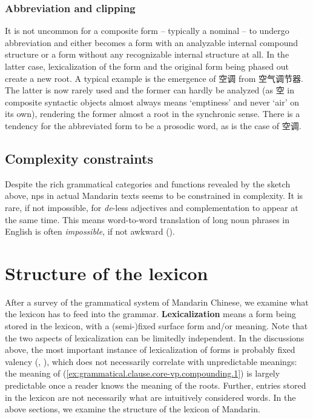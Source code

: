 \documentclass[UTF8, a4paper, oneside, scheme=plain, 12pt]{ctexrep}
\newcommand*{\concept}[1]{\textbf{#1}}
\newcommand{\form}[1]{\emph{#1}}
\newcommand{\translate}[1]{`#1'}
\begin{document}
\subsubsection{Abbreviation and clipping}\label{sec:grammatical.np.derivation.abbreviation}

It is not uncommon for a composite form -- typically a nominal -- to undergo abbreviation
and either becomes a form with an analyzable internal compound structure
or a form without any recognizable internal structure at all.
In the latter case, lexicalization of the form and the original form being phased out
create a new root.
A typical example is the emergence of 空调 from 空气调节器.
The latter is now rarely used
and the former can hardly be analyzed 
(as 空 in composite syntactic objects almost always means \translate{emptiness} and never \translate{air} on its own),
rendering the former almost a root in the synchronic sense.
There is a tendency for the abbreviated form to be a prosodic word,
as is the case of 空调.

\subsection{Complexity constraints}\label{sec:grammatical.np.complexity}

Despite the rich grammatical categories and functions revealed by the sketch above,
\acp{np} in actual Mandarin texts seems to be constrained in complexity.
It is rare, if not impossible, for \form{de}-less adjectives and complementation to appear at the same time.
This means word-to-word translation of long noun phrases in English is often \emph{impossible},
if not awkward ().

\section{Structure of the lexicon}\label{sec:grammatical.lexicon}

After a survey of the grammatical system of Mandarin Chinese,
we examine what the lexicon has to feed into the grammar.
\concept{Lexicalization} means a form being stored in the lexicon,
with a (semi-)fixed surface form and/or meaning.
Note that the two aspects of lexicalization can be limitedly independent.
In the discussions above, the most important instance of lexicalization of forms
is probably fixed valency
(, ),
which does not necessarily correlate with unpredictable meanings:
the meaning of (\ref{ex:grammatical.clause.core-vp.compounding.1}) is largely predictable
once a reader knows the meaning of the roots.
Further, entries stored in the lexicon are not necessarily what are intuitively considered words.
In the above sections, we examine the structure of the lexicon of Mandarin.
\end{document}
